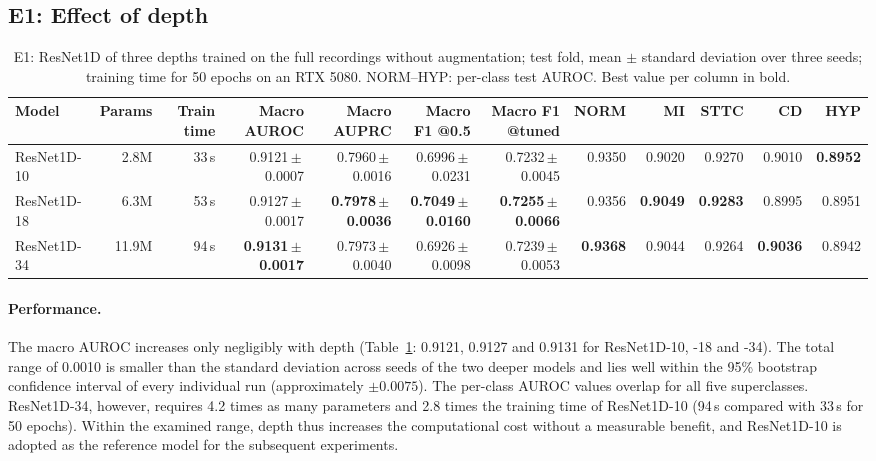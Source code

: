 \documentclass{article}
\begin{document}
\subsection{E1: Effect of depth}
\label{sec:e1}

\begin{table}[htb]
  \caption{E1: ResNet1D of three depths trained on the full recordings without augmentation; test fold, mean $\pm$ standard deviation over three seeds; training time for 50 epochs on an RTX 5080. NORM--HYP: per-class test AUROC. Best value per column in bold.}
  \label{tab:e1}
  \centering\footnotesize
  \begin{adjustbox}{max width=\linewidth}
  \begin{tabular}{lrrrrrrrrrrr}
    \toprule
    Model & Params & Train time & Macro AUROC & Macro AUPRC & Macro F1 @0.5 & Macro F1 @tuned & NORM & MI & STTC & CD & HYP \\
    \midrule
    ResNet1D-10 & 2.8M & 33\,s & 0.9121\,$\pm$\,0.0007 & 0.7960\,$\pm$\,0.0016 & 0.6996\,$\pm$\,0.0231 & 0.7232\,$\pm$\,0.0045 & 0.9350 & 0.9020 & 0.9270 & 0.9010 & \textbf{0.8952} \\
    ResNet1D-18 & 6.3M & 53\,s & 0.9127\,$\pm$\,0.0017 & \textbf{0.7978\,$\pm$\,0.0036} & \textbf{0.7049\,$\pm$\,0.0160} & \textbf{0.7255\,$\pm$\,0.0066} & 0.9356 & \textbf{0.9049} & \textbf{0.9283} & 0.8995 & 0.8951 \\
    ResNet1D-34 & 11.9M & 94\,s & \textbf{0.9131\,$\pm$\,0.0017} & 0.7973\,$\pm$\,0.0040 & 0.6926\,$\pm$\,0.0098 & 0.7239\,$\pm$\,0.0053 & \textbf{0.9368} & 0.9044 & 0.9264 & \textbf{0.9036} & 0.8942 \\
    \bottomrule
  \end{tabular}
  \end{adjustbox}
\end{table}


\paragraph{Performance.} The macro AUROC increases only negligibly with depth (Table~\ref{tab:e1}: 0.9121, 0.9127 and 0.9131 for ResNet1D-10, -18 and -34). The total range of 0.0010 is smaller than the standard deviation across seeds of the two deeper models and lies well within the 95\% bootstrap confidence interval of every individual run (approximately $\pm0.0075$). The per-class AUROC values overlap for all five superclasses. ResNet1D-34, however, requires 4.2 times as many parameters and 2.8 times the training time of ResNet1D-10 (94\,s compared with 33\,s for 50 epochs). Within the examined range, depth thus increases the computational cost without a measurable benefit, and ResNet1D-10 is adopted as the reference model for the subsequent experiments.
\end{document}
